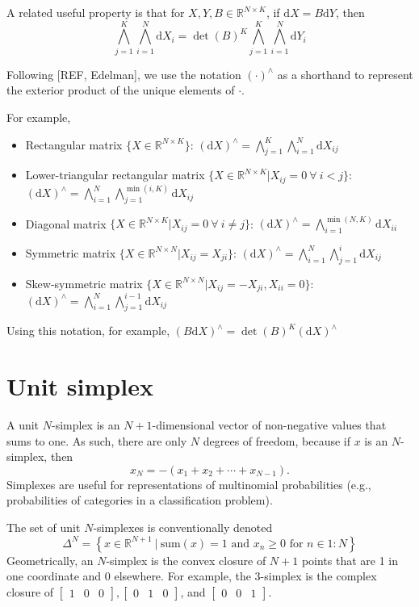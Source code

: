 \documentclass[11pt]{article}
\newcommand{\setcomp}[2]{\left\{ #1 \ \Big|\ #2 \right\}}
\newcommand{\rngto}[1]{1{:}#1}
\newcommand{\dv}[1]{\mathrm{d}{#1}}
\begin{document}
A related useful property is that for $X,Y,B \in \mathbb{R}^{N \times K}$, if $\dv{X} = B \dv{Y}$, then
\[\bigwedge_{j=1}^K \bigwedge_{i=1}^N \dv{X_i} = \det(B)^K \bigwedge_{j=1}^K \bigwedge_{i=1}^N \dv{Y_i}\]

Following [REF, Edelman], we use the notation $(\cdot)^\wedge$ as a shorthand to represent the exterior product of the unique elements of $\cdot$.

For example,
\begin{itemize}
  \item Rectangular matrix $\{X \in \mathbb{R}^{N \times K}\}$: $(\dv{X})^\wedge = \bigwedge_{j=1}^K \bigwedge_{i=1}^N \dv{X_{ij}}$
  \item Lower-triangular rectangular matrix $\{X \in \mathbb{R}^{N \times K} | X_{ij} = 0\ \forall\ i < j\}$: $(\dv{X})^\wedge = \bigwedge_{i=1}^N \bigwedge_{j=1}^{\min(i, K)} \dv{X_{ij}}$
  \item Diagonal matrix $\{X \in \mathbb{R}^{N \times K} | X_{ij} = 0\ \forall\ i \ne j\}$: $(\dv{X})^\wedge = \bigwedge_{i=1}^{\min(N, K)} \dv{X_{ii}}$
  \item Symmetric matrix $\{X \in \mathbb{R}^{N \times N} | X_{ij} = X_{ji}\}$: $(\dv{X})^\wedge = \bigwedge_{i=1}^N \bigwedge_{j=1}^i \dv{X_{ij}}$
  \item Skew-symmetric matrix $\{X \in \mathbb{R}^{N \times N} | X_{ij} = -X_{ji}, X_{ii} = 0\}$: $(\dv{X})^\wedge = \bigwedge_{i=1}^N \bigwedge_{j=1}^{i-1} \dv{X_{ij}}$
\end{itemize}

Using this notation, for example, $(B \dv{X})^\wedge = \det(B)^K (\dv{X})^\wedge$

\section{Unit simplex}

A unit $N$-simplex is an $N + 1$-dimensional vector of non-negative
values that sums to one.  As such, there are only $N$ degrees of
freedom, because if $x$ is an $N$-simplex, then
\[
  x_N = -(x_1 + x_2 + \cdots + x_{N-1}).
\]
Simplexes are useful for representations of multinomial probabilities
(e.g., probabilities of categories in a classification problem).

The set of unit $N$-simplexes is conventionally denoted
\[
  \Delta^N = \setcomp{x \in \mathbb{R}^{N + 1}}{\textrm{sum}(x) = 1
    \textrm{ and }
    x_n \geq 0 \textrm{ for } n \in \rngto{N}}
\]
Geometrically, an $N$-simplex is the convex closure of $N+1$ points
that are 1 in one coordinate and 0 elsewhere.  For example, the
3-simplex is the complex closure of
$\begin{bmatrix}1 & 0 & 0 \end{bmatrix},
\begin{bmatrix} 0 & 1 & 0 \end{bmatrix}$,
and $\begin{bmatrix} 0 & 0 & 1 \end{bmatrix}$.
\end{document}
